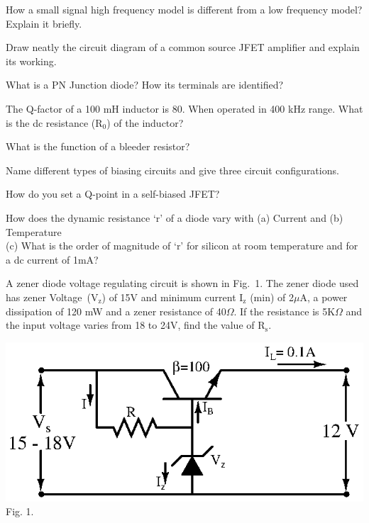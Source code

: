 \item \iitem How a small signal high frequency model is different from a low frequency model? Explain it
  briefly.
\Or
\item Draw neatly the circuit diagram of a common source JFET amplifier and explain its working.
\ene

\ene

\newpage

\sub{\subj}
\maxtime

\partA

\iitem What is a PN Junction diode? How its terminals are identified?
\item The Q-factor of a 100 mH inductor is 80. When operated in 400 kHz range. What
  is the dc resistance (R$_0$) of the inductor?
\item What is the function of a bleeder resistor?
\item Name different types of biasing circuits and give three circuit configurations.
\item How do you set a Q-point in a self-biased JFET?

\markA
\partB

\item How does the dynamic resistance `r' of a diode vary with (a) Current and (b)
  Temperature\\ (c) What is the order of magnitude of `r' for silicon at room
  temperature and for a dc current of 1mA?

\item A zener diode voltage regulating circuit is shown in \mbox{Fig. 1}. The zener
  diode used has zener Voltage~(V$_\text{z}$) of 15V and minimum current I$_\text{z}$
  (min) of 2$\mu$A, a power dissipation of 120 mW and a zener resistance of 40$\Omega$.
  If the resistance is 5K$\Omega$ and the input voltage varies from 18 to 24V, find
  the value of R$_\text{s}$.

\begin{center}
\includegraphics{src/s3/ai/09_303/fig001}\\
Fig. 1.
\end{center}



